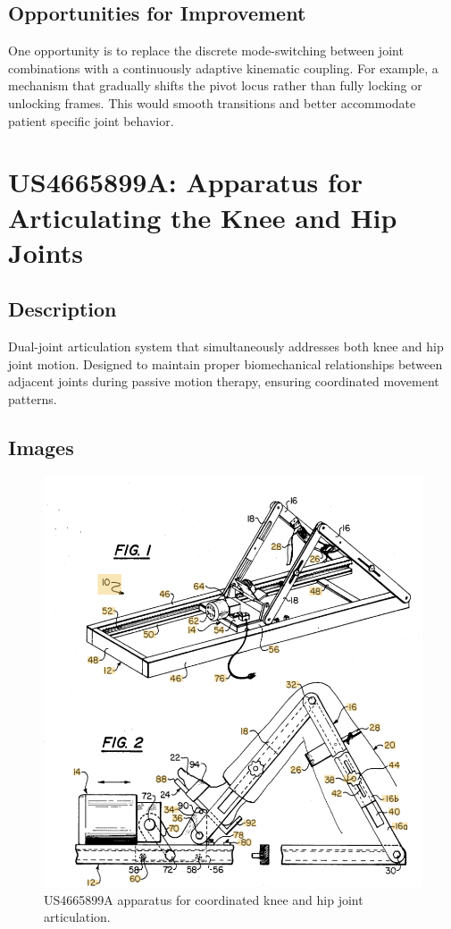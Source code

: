 \documentclass[11pt]{article}
\begin{document}
\subsection{Opportunities for Improvement}
One opportunity is to replace the discrete mode-switching between joint combinations with a continuously adaptive kinematic coupling. For example, a mechanism that gradually shifts the pivot locus rather than fully locking or unlocking frames. This would smooth transitions and better accommodate patient specific joint behavior.

\section{US4665899A: Apparatus for Articulating the Knee and Hip Joints}
\subsection{Description}
Dual-joint articulation system that simultaneously addresses both knee and hip joint motion. Designed to maintain proper biomechanical relationships between adjacent joints during passive motion therapy, ensuring coordinated movement patterns.
\subsection{Images}
\begin{figure}[H]
  \centering
  \includegraphics[width=0.54\linewidth]{US4665899A.png}
  \caption{US4665899A apparatus for coordinated knee and hip joint articulation.}
  \label{fig:US4665899A}
\end{figure}
\end{document}
